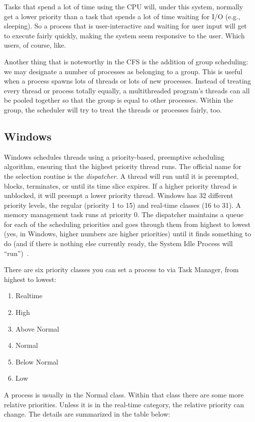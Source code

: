 Tasks that spend a lot of time using the CPU will, under this system, normally get a lower priority than a task that spends a lot of time waiting for I/O (e.g., sleeping). So a process that is user-interactive and waiting for user input will get to execute fairly quickly, making the system seem responsive to the user. Which users, of course, like.

Another thing that is noteworthy in the CFS is the addition of group scheduling: we may designate a number of processes as belonging to a group. This is useful when a process spawns lots of threads or lots of new processes. Instead of treating every thread or process totally equally, a multithreaded program's threads can all be pooled together so that the group is equal to other processes. Within the group, the scheduler will try to treat the threads or processes fairly, too.

\subsection*{Windows}

Windows schedules threads using a priority-based, preemptive scheduling algorithm, ensuring that the highest priority thread runs. The official name for the selection routine is the \textit{dispatcher}. A thread will run until it is preempted, blocks, terminates, or until its time slice expires. If a higher priority thread is unblocked, it will preempt a lower priority thread. Windows has 32 different priority levels, the regular (priority 1 to 15) and real-time classes (16 to 31). A memory management task runs at priority 0. The dispatcher maintains a queue for each of the scheduling priorities and goes through them from highest to lowest (yes, in Windows, higher numbers are higher priorities) until it finds something to do (and if there is nothing else currently ready, the System Idle Process will ``run'')~\cite{osc}.

There are six priority classes you can set a process to via Task Manager, from highest to lowest:
\begin{enumerate}
	\item Realtime
	\item High
	\item Above Normal
	\item Normal
	\item Below Normal
	\item Low
\end{enumerate}

A process is usually in the Normal class. Within that class there are some more relative priorities. Unless it is in the real-time category, the relative priority can change. The details are summarized in the table below:

